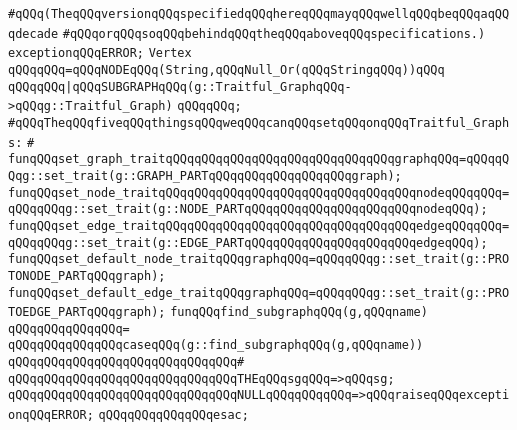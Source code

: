 \verb|#qQQq(TheqQQqversionqQQqspecifiedqQQqhereqQQqmayqQQqwellqQQqbeqQQqaqQQqdecade|\newline
\verb|#qQQqorqQQqsoqQQqbehindqQQqtheqQQqaboveqQQqspecifications.)|\newline
\newline
\verb|exceptionqQQqERROR;|\newline
\newline
\verb|Vertex|\newline
\verb|qQQqqQQq=qQQqNODEqQQq(String,qQQqNull_Or(qQQqStringqQQq))qQQq|\newline
\verb|qQQqqQQq|\verb#|qQQqSUBGRAPHqQQq(g::Traitful_GraphqQQq->qQQqg::Traitful_Graph)#\newline
\verb|qQQqqQQq;|\newline
\newline
\verb|#qQQqTheqQQqfiveqQQqthingsqQQqweqQQqcanqQQqsetqQQqonqQQqTraitful_Graphs:|\newline
\verb|#|\newline
\verb|funqQQqset_graph_traitqQQqqQQqqQQqqQQqqQQqqQQqqQQqqQQqgraphqQQq=qQQqqQQqg::set_trait(g::GRAPH_PARTqQQqqQQqqQQqqQQqqQQqgraph);|\newline
\verb|funqQQqset_node_traitqQQqqQQqqQQqqQQqqQQqqQQqqQQqqQQqqQQqnodeqQQqqQQq=qQQqqQQqg::set_trait(g::NODE_PARTqQQqqQQqqQQqqQQqqQQqqQQqnodeqQQq);|\newline
\verb|funqQQqset_edge_traitqQQqqQQqqQQqqQQqqQQqqQQqqQQqqQQqqQQqedgeqQQqqQQq=qQQqqQQqg::set_trait(g::EDGE_PARTqQQqqQQqqQQqqQQqqQQqqQQqedgeqQQq);|\newline
\verb|funqQQqset_default_node_traitqQQqgraphqQQq=qQQqqQQqg::set_trait(g::PROTONODE_PARTqQQqgraph);|\newline
\verb|funqQQqset_default_edge_traitqQQqgraphqQQq=qQQqqQQqg::set_trait(g::PROTOEDGE_PARTqQQqgraph);|\newline
\newline
\verb|funqQQqfind_subgraphqQQq(g,qQQqname)|\newline
\verb|qQQqqQQqqQQqqQQq=|\newline
\verb|qQQqqQQqqQQqqQQqcaseqQQq(g::find_subgraphqQQq(g,qQQqname))|\newline
\verb|qQQqqQQqqQQqqQQqqQQqqQQqqQQqqQQq#|\newline
\verb|qQQqqQQqqQQqqQQqqQQqqQQqqQQqqQQqTHEqQQqsgqQQq=>qQQqsg;|\newline
\verb|qQQqqQQqqQQqqQQqqQQqqQQqqQQqqQQqNULLqQQqqQQqqQQq=>qQQqraiseqQQqexceptionqQQqERROR;|\newline
\verb|qQQqqQQqqQQqqQQqesac;|\newline
